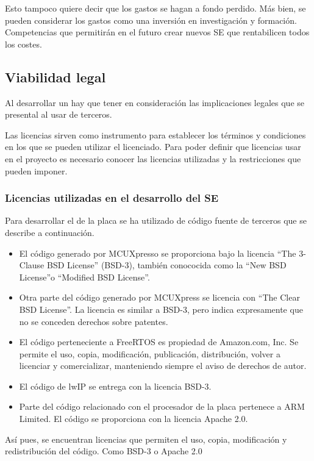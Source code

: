 Esto tampoco quiere decir que los gastos se hagan a fondo perdido. Más bien,
se pueden considerar los gastos como una inversión en investigación y formación.
Competencias que permitirán en el futuro crear nuevos SE que rentabilicen todos
los costes.

\subsection{Viabilidad legal}
Al desarrollar un  hay que tener en consideración
las implicaciones legales que se presental al usar 
de terceros.

Las licencias sirven como instrumento para establecer los términos y condiciones
en los que se pueden utilizar el  licenciado. Para
poder definir que licencias usar en el proyecto es necesario conocer las
licencias utilizadas y la restricciones que pueden imponer.

\subsubsection{Licencias utilizadas en el desarrollo del SE}
Para desarrollar el  de la placa se ha utilizado
de código fuente de terceros que se describe a continuación.
\begin{itemize}
  \item El código generado por MCUXpresso se proporciona bajo la licencia
  ``The 3-Clause BSD License'' (BSD-3), también conococida como la
  ``New BSD License''o ``Modified BSD License''.
  \item Otra parte del código generado por MCUXpress se licencia con 
  ``The Clear BSD License''. La licencia es similar a BSD-3, pero indica
  expresamente que no se conceden derechos sobre patentes.
  \item El código perteneciente a FreeRTOS es propiedad de Amazon.com, Inc.
  Se permite el uso, copia, modificación, publicación, distribución, volver a
  licenciar y comercializar, manteniendo siempre el aviso de derechos de autor.
  \item El código de lwIP se entrega con la licencia BSD-3.
  \item Parte del código relacionado con el procesador de la placa pertenece a
  ARM Limited. El código se proporciona con la licencia Apache 2.0.
\end{itemize}

Así pues, se encuentran licencias que permiten el uso, copia, modificación y 
redistribución del código. Como BSD-3 o Apache 2.0

